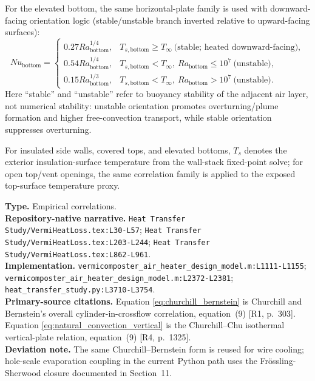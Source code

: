 \documentclass[11pt]{article}
\newcommand{\srcref}[1]{\nolinkurl{#1}}
\newcommand{\filepath}[1]{\nolinkurl{#1}}
\begin{document}
For the elevated bottom, the same horizontal-plate family is used with downward-facing orientation logic (stable/unstable branch inverted relative to upward-facing surfaces):
\begin{equation}
\label{eq:natural_convection_bottom}
Nu_{\mathrm{bottom}}=
\begin{cases}
0.27Ra_{\mathrm{bottom}}^{1/4}, & T_{s,\mathrm{bottom}}\ge T_\infty\ \text{(stable; heated downward-facing)},\\
0.54Ra_{\mathrm{bottom}}^{1/4}, & T_{s,\mathrm{bottom}}<T_\infty,\ Ra_{\mathrm{bottom}}\le 10^7\ \text{(unstable)},\\
0.15Ra_{\mathrm{bottom}}^{1/3}, & T_{s,\mathrm{bottom}}<T_\infty,\ Ra_{\mathrm{bottom}}>10^7\ \text{(unstable)}.
\end{cases}
\end{equation}
Here ``stable'' and ``unstable'' refer to buoyancy stability of the adjacent air layer, not numerical stability: unstable orientation promotes overturning/plume formation and higher free-convection transport, while stable orientation suppresses overturning.

For insulated side walls, covered tops, and elevated bottoms, \(T_s\) denotes the exterior insulation-surface temperature from the wall-stack fixed-point solve; for open top/vent openings, the same correlation family is applied to the exposed top-surface temperature proxy.

\textbf{Type.} Empirical correlations. \\
\textbf{Repository-native narrative.} \filepath{Heat Transfer Study/VermiHeatLoss.tex:L30-L57}; \filepath{Heat Transfer Study/VermiHeatLoss.tex:L203-L244}; \filepath{Heat Transfer Study/VermiHeatLoss.tex:L862-L961}. \\
\textbf{Implementation.} \srcref{vermicomposter_air_heater_design_model.m:L1111-L1155}; \srcref{vermicomposter_air_heater_design_model.m:L2372-L2381}; \srcref{heat_transfer_study.py:L3710-L3754}. \\
\textbf{Primary-source citations.} Equation \eqref{eq:churchill_bernstein} is Churchill and Bernstein's overall cylinder-in-crossflow correlation, equation~(9) [R1, p.~303]. Equation \eqref{eq:natural_convection_vertical} is the Churchill--Chu isothermal vertical-plate relation, equation~(9) [R4, p.~1325]. \\
\textbf{Deviation note.} The same Churchill--Bernstein form is reused for wire cooling; hole-scale evaporation coupling in the current Python path uses the Fr\"ossling-Sherwood closure documented in Section~11.
\end{document}
